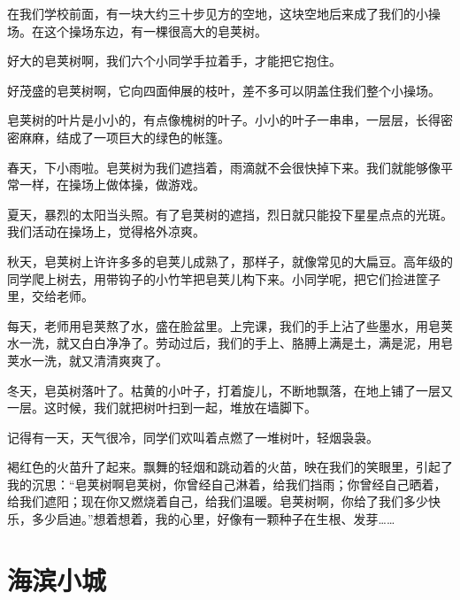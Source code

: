 \documentclass[12pt,UTF-8,openany]{ctexbook}
\begin{document}
\begin{large}
    
    在我们学校前面，有一块大约三十步见方的空地，这块空地后来成了我们的小操场。在这个操场东边，有一棵很高大的皂荚树。
    
    好大的皂荚树啊，我们六个小同学手拉着手，才能把它抱住。
    
    好茂盛的皂荚树啊，它向四面伸展的枝叶，差不多可以阴盖住我们整个小操场。
    
    皂荚树的叶片是小小的，有点像槐树的叶子。小小的叶子一串串，一层层，长得密密麻麻，结成了一项巨大的绿色的帐篷。
    
    春天，下小雨啦。皂荚树为我们遮挡着，雨滴就不会很快掉下来。我们就能够像平常一样，在操场上做体操，做游戏。
    
    夏天，暴烈的太阳当头照。有了皂荚树的遮挡，烈日就只能投下星星点点的光斑。我们活动在操场上，觉得格外凉爽。
    
    秋天，皂荚树上许许多多的皂荚儿成熟了，那样子，就像常见的大扁豆。高年级的同学爬上树去，用带钩子的小竹竿把皂荚儿构下来。小同学呢，把它们捡进筐子里，交给老师。
    
    每天，老师用皂荚熬了水，盛在脸盆里。上完课，我们的手上沾了些墨水，用皂荚水一洗，就又白白净净了。劳动过后，我们的手上、胳膊上满是土，满是泥，用皂荚水一洗，就又清清爽爽了。
    
    冬天，皂英树落叶了。枯黄的小叶子，打着旋儿，不断地飘落，在地上铺了一层又一层。这时候，我们就把树叶扫到一起，堆放在墙脚下。
    
    记得有一天，天气很冷，同学们欢叫着点燃了一堆树叶，轻烟袅袅。
    
    褐红色的火苗升了起来。飘舞的轻烟和跳动着的火苗，映在我们的笑眼里，引起了我的沉思：“皂荚树啊皂荚树，你曾经自己淋着，给我们挡雨；你曾经自己晒着，给我们遮阳；现在你又燃烧着自己，给我们温暖。皂荚树啊，你给了我们多少快乐，多少启迪。”想着想着，我的心里，好像有一颗种子在生根、发芽……
    
\end{large}



\chapter{海滨小城}
\end{document}
